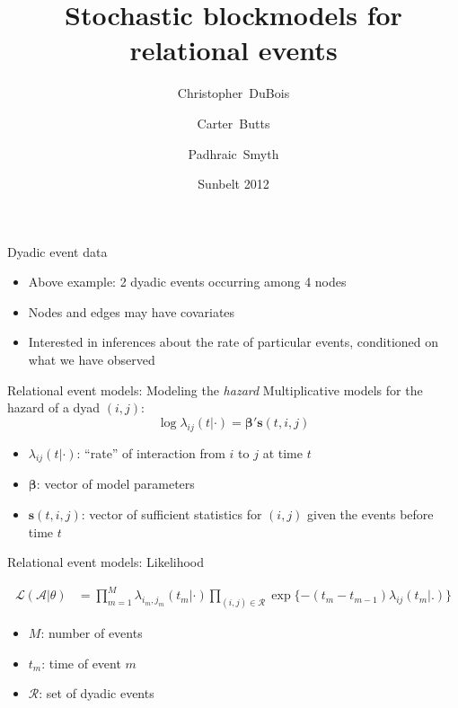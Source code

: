 \documentclass{beamer}
\title{Stochastic blockmodels for relational events}
\author[DuBois, Christopher] %
{Christopher~DuBois\inst{1} \and Carter~Butts\inst{2} \and Padhraic~Smyth\inst{3}}
\institute[] %
{
  \inst{1}%
Department of Statistics \\
University of California, Irvine
  \and
  \inst{2}%
Department of Sociology \\
University of California, Irvine
  \and
  \inst{2}%
Department of Computer Science \\
University of California, Irvine
}
\date[Sunbelt 2012] %
{Sunbelt 2012}
\begin{document}
\frame{\titlepage}

\begin{frame}{Dyadic event data}
\begin{figure}
{
}
\end{figure}

\begin{itemize}
\item Above example: 2 dyadic events occurring among 4 nodes
\item Nodes and edges may have covariates
\item Interested in inferences about the rate of particular events, conditioned on what we have observed
\end{itemize}
\end{frame}

\begin{frame}{Relational event models: Modeling the \emph{hazard}}
Multiplicative models for the hazard of a dyad $(i,j)$:
$$\log \lambda_{ij}(t | \cdot) = \boldsymbol{\beta}' \mathbf{s}(t,i,j)$$
\begin{itemize}
\item $\lambda_{ij}(t | \cdot)$: ``rate'' of interaction from $i$ to
  $j$ at time $t$
\item $\boldsymbol{\beta}$: vector of model parameters
\item $\mathbf{s}(t,i,j)$: vector of sufficient statistics for $(i,j)$
  given the events before time $t$
\end{itemize}
\end{frame}

\begin{frame}{Relational event models: Likelihood}

\begin{align}
\mathcal{L}(\mathcal{A}|\theta) &= \prod_{m=1}^M \lambda_{i_m,j_m}(t_m|\cdot) \prod_{(i,j) \in \mathcal{R}}\exp\{ - (t_m - t_{m-1}) \lambda_{ij}(t_m | .) \}
\end{align}

\begin{itemize}
\item $M$: number of events
\item $t_m$: time of event $m$
\item $\mathcal{R}$: set of dyadic events
\end{itemize}

\end{frame}
\end{document}
